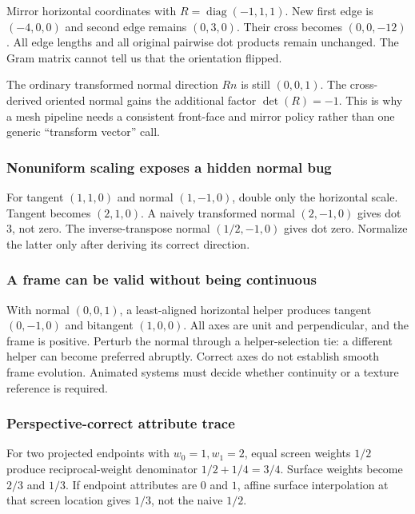 Mirror horizontal coordinates with \(R=\operatorname{diag}(-1,1,1)\). New first edge is \((-4,0,0)\) and second edge remains \((0,3,0)\). Their cross becomes \((0,0,-12)\). All edge lengths and all original pairwise dot products remain unchanged. The Gram matrix cannot tell us that the orientation flipped.

The ordinary transformed normal direction \(Rn\) is still \((0,0,1)\). The cross-derived oriented normal gains the additional factor \(\det(R)=-1\). This is why a mesh pipeline needs a consistent front-face and mirror policy rather than one generic ``transform vector'' call.

\subsubsection{Nonuniform scaling exposes a hidden normal bug}\label{appendix-92ff77d4dfdc-nonuniform-scaling-exposes-a-hidden-normal-bug}

For tangent \((1,1,0)\) and normal \((1,-1,0)\), double only the horizontal scale. Tangent becomes \((2,1,0)\). A naively transformed normal \((2,-1,0)\) gives dot \(3\), not zero. The inverse-transpose normal \((1/2,-1,0)\) gives dot zero. Normalize the latter only after deriving its correct direction.

\subsubsection{A frame can be valid without being continuous}\label{appendix-92ff77d4dfdc-a-frame-can-be-valid-without-being-continuous}

With normal \((0,0,1)\), a least-aligned horizontal helper produces tangent \((0,-1,0)\) and bitangent \((1,0,0)\). All axes are unit and perpendicular, and the frame is positive. Perturb the normal through a helper-selection tie: a different helper can become preferred abruptly. Correct axes do not establish smooth frame evolution. Animated systems must decide whether continuity or a texture reference is required.

\subsubsection{Perspective-correct attribute trace}\label{appendix-92ff77d4dfdc-perspective-correct-attribute-trace}

For two projected endpoints with \(w_0=1,w_1=2\), equal screen weights \(1/2\) produce reciprocal-weight denominator \(1/2+1/4=3/4\). Surface weights become \(2/3\) and \(1/3\). If endpoint attributes are \(0\) and \(1\), affine surface interpolation at that screen location gives \(1/3\), not the naive \(1/2\).

